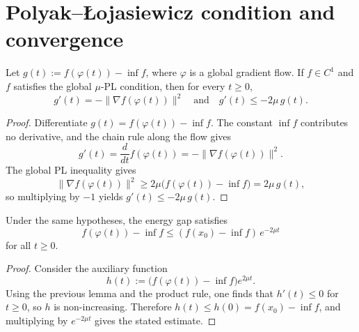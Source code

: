 
\chapter{Polyak--Łojasiewicz condition and convergence}\label{sec:PL}

\begin{lemma}\label{lem:energyGap_hasDerivAt_and_le}
  \leanok{}
  Let $g(t):=f(\varphi(t))-\inf f$, where $\varphi$ is a global gradient flow.
  If $f\in C^1$ and $f$ satisfies the global $\mu$-PL condition, then for every $t\ge 0$,
  \[
    g'(t)=-\|\nabla f(\varphi(t))\|^2
    \quad\text{and}\quad
    g'(t)\le -2\mu\,g(t).
  \]
\end{lemma}

\begin{proof}
  \leanok{}
  Differentiate $g(t)=f(\varphi(t))-\inf f$. The constant $\inf f$ contributes no derivative, and the chain rule
  along the flow gives
  \[
    g'(t)=\frac{d}{dt}f(\varphi(t))=-\|\nabla f(\varphi(t))\|^2.
  \]
  The global PL inequality gives
  \[
    \|\nabla f(\varphi(t))\|^2\ge 2\mu\bigl(f(\varphi(t))-\inf f\bigr)=2\mu\,g(t),
  \]
  so multiplying by $-1$ yields $g'(t)\le -2\mu\,g(t)$.
\end{proof}

\begin{lemma}\label{lem:energyGap_exp_bound}
  \leanok{}
  Under the same hypotheses, the energy gap satisfies
  \[
    f(\varphi(t)) - \inf f \le (f(x_0)-\inf f)\,e^{-2\mu t}
  \]
  for all $t\ge 0$.
\end{lemma}

\begin{proof}
  \leanok{}
  Consider the auxiliary function
  \[
    h(t):=\bigl(f(\varphi(t))-\inf f\bigr)e^{2\mu t}.
  \]
  Using the previous lemma and the product rule, one finds that $h'(t)\le 0$ for $t\ge 0$, so $h$ is non-increasing.
  Therefore $h(t)\le h(0)=f(x_0)-\inf f$, and multiplying by $e^{-2\mu t}$ gives the stated estimate.
\end{proof}

